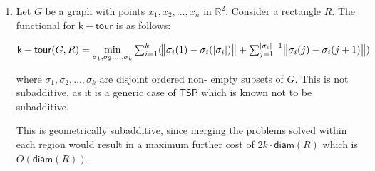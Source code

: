 \documentclass{article}
\newcommand{\lang}[1]{\mathsf{#1}}
\begin{document}
\begin{enumerate}
\begin{enumerate}
		\item Let $G$ be a graph with points $x_1,x_2,\ldots,x_n$ in $\mathbb{R}^2$. Consider a rectangle $R$. The functional for $\lang{k-tour}$ is as follows:
		
		$\lang{k-tour}(G,R) = \min\limits_{\sigma_1,\sigma_2,\ldots, \sigma_k }\sum_{i=1}^{k}( \norm{\sigma_i(1)-\sigma_i(|\sigma_i|)}+\sum_{j=1}^{|\sigma_i|-1} \norm{\sigma_i(j) - \sigma_i(j+1)})$
		
		where $\sigma_1,\sigma_2,\ldots,\sigma_k$ are disjoint ordered non- empty subsets of $G$. This is not subadditive, as it is a generic case of $\lang{TSP}$ which is known not to be subadditive. 
		
		This is geometrically subadditive, since merging the problems solved within each region would result in a maximum further cost of $2k\cdot \lang{diam}(R)$ which is $O(\lang{diam}(R))$.
	\end{enumerate}
	\end{enumerate}
\end{document}
